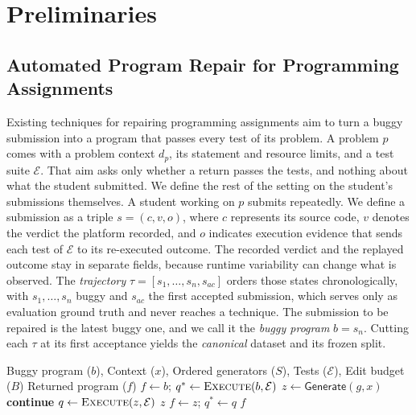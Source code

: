 \documentclass[10pt,conference]{IEEEtran}
\begin{document}
\section{Preliminaries}
\label{sec:preliminaries}
\subsection{Automated Program Repair for Programming Assignments}
\label{sec:formulation}

Existing techniques for repairing programming assignments aim to turn a buggy submission into a program that passes every test of its problem. A problem \(p\) comes with a problem context \(d_p\), its statement and resource limits, and a test suite \(\mathcal E\). That aim asks only whether a return passes the tests, and nothing about what the student submitted. We define the rest of the setting on the student's submissions themselves. A student working on \(p\) submits repeatedly. We define a submission as a triple \(s=(c,v,o)\), where \(c\) represents its source code, \(v\) denotes the verdict the platform recorded, and \(o\) indicates execution evidence that sends each test of \(\mathcal E\) to its re-executed outcome. The recorded verdict and the replayed outcome stay in separate fields, because runtime variability can change what is observed. The \emph{trajectory} \(\tau=[s_1,\ldots,s_n,s_{\mathit{ac}}]\) orders those states chronologically, with \(s_1,\ldots,s_n\) buggy and \(s_{\mathit{ac}}\) the first accepted submission, which serves only as evaluation ground truth and never reaches a technique. The submission to be repaired is the latest buggy one, and we call it the \emph{buggy program} \(b=s_n\). Cutting each \(\tau\) at its first acceptance yields the \emph{canonical} dataset and its frozen split.

\begin{algorithm}[h]
\caption{APR for Programming Assignments}
\label{alg:generic}
\footnotesize
\begin{algorithmic}[1]
\Require Buggy program ($b$), Context ($x$), Ordered generators ($S$), Tests ($\mathcal E$), Edit budget ($B$)
\Ensure Returned program ($f$)
\State $f\gets b$; $q^*\gets\textsc{Execute}(b,\mathcal E)$
 \State $z\gets\mathsf{Generate}(g,x)$
  \State \textbf{continue}
 \EndIf
 \State $q\gets\textsc{Execute}(z,\mathcal E)$
  \State \Return $z$ \EndIf
  \State $f\gets z$; $q^*\gets q$
 \EndIf
\EndFor
\State \Return $f$
\EndProcedure
\end{algorithmic}
\end{algorithm}
\end{document}
